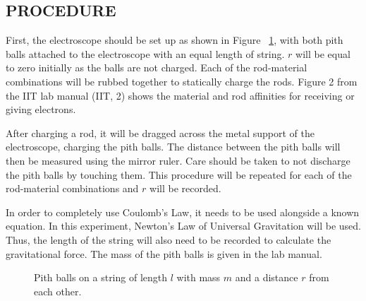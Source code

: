 \documentclass [12pt, letterpaper, twoside]{article}
\begin{document}
\subsection*{PROCEDURE}
First, the electroscope should be set up as shown in Figure ~\ref{fig:1}, with both pith balls attached to the electroscope with an equal length of string. \(r\) will be equal to zero initially as the balls are not charged. Each of the rod-material combinations will be rubbed together to statically charge the rods. Figure 2 from the IIT lab manual (IIT, 2) shows the material and rod affinities for receiving or giving electrons.

After charging a rod, it will be dragged across the metal support of the electroscope, charging the pith balls. The distance between the pith balls will then be measured using the mirror ruler. Care should be taken to not discharge the pith balls by touching them. This procedure will be repeated for each of the rod-material combinations and \(r\) will be recorded.

In order to completely use Coulomb's Law, it needs to be used alongside a known equation. In this experiment, Newton's Law of Universal Gravitation will be used. Thus, the length of the string will also need to be recorded to calculate the gravitational force. The mass of the pith balls is given in the lab manual.

\begin{figure}
  \begin{center}
    \caption{Pith balls on a string of length \(l\) with mass \(m\) and a distance \(r\) from each other.}
    \label{fig:1}
  \end{center}
\end{figure}
\end{document}
